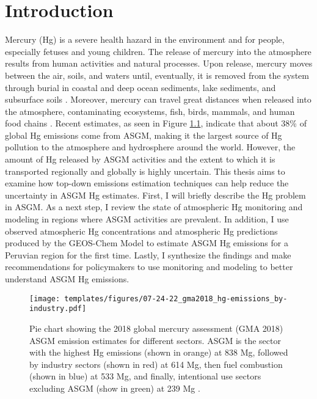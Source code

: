 
\chapter{Introduction}
Mercury (Hg) is a severe health hazard in the environment and for people, especially fetuses and young children\cite{gibb_mercury_2014}. The release of mercury into the atmosphere results from human activities and natural processes. Upon release, mercury moves between the air, soils, and waters until, eventually, it is removed from the system through burial in coastal and deep ocean sediments, lake sediments, and subsurface soils \cite{esdaile_mercury_2018}. Moreover, mercury can travel great distances when released into the atmosphere, contaminating ecosystems, fish, birds, mammals, and human food chains \cite{esdaile_mercury_2018}. Recent estimates, as seen in Figure \ref{fig:gma2018_hg-emissions_by-industry},  indicate that about 38\% of global Hg emissions come from ASGM, making it the largest source of Hg pollution to the atmosphere and hydrosphere around the world\cite{united_nations_environment_programme_technical_2019}. However, the amount of Hg released by ASGM activities and the extent to which it is transported regionally and globally is highly uncertain. This thesis aims to examine how top-down emissions estimation techniques can help reduce the uncertainty in ASGM Hg estimates. First, I will briefly describe the Hg problem in ASGM. As a next step, I review the state of atmospheric Hg monitoring and modeling in regions where ASGM activities are prevalent. In addition, I use observed atmospheric Hg concentrations and atmospheric Hg predictions produced by the GEOS-Chem Model to estimate ASGM Hg emissions for a Peruvian region for the first time. Lastly, I synthesize the findings and make recommendations for policymakers to use monitoring and modeling to better understand ASGM Hg emissions.

\begin{figure}[H]
  \texttt{[image: templates/figures/07-24-22\_gma2018\_hg-emissions\_by-industry.pdf]}
  \centering
  \caption{Pie chart showing the 2018 global mercury assessment (GMA 2018) ASGM \hg emission estimates for different sectors. ASGM is the sector with the highest Hg emissions (shown in orange) at 838 Mg, followed by industry sectors (shown in red) at 614 Mg, then fuel combustion (shown in blue) at 533 Mg, and finally, intentional use sectors excluding ASGM (show in green) at 239 Mg \cite{united_nations_environment_programme_technical_2019}.}
  \label{fig:gma2018_hg-emissions_by-industry}
\end{figure}
\FloatBarrier

